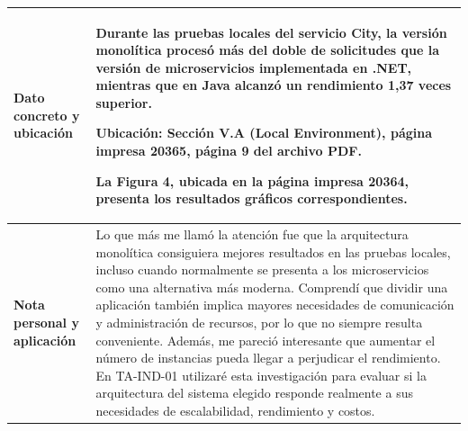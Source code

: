 \documentclass[11pt,a4paper]{article}
\begin{document}
\begin{longtable}{
|>{\raggedright\arraybackslash\bfseries}p{3.4cm}
|>{\raggedright\arraybackslash}p{11.6cm}|
}
Dato concreto y ubicación
&
Durante las pruebas locales del servicio City, la versión monolítica procesó más del doble de solicitudes que la versión de microservicios implementada en .NET, mientras que en Java alcanzó un rendimiento 1,37 veces superior.

\par\smallskip

\textbf{Ubicación:}
Sección V.A (Local Environment),
página impresa 20365,
página 9 del archivo PDF.

La Figura 4, ubicada en la página
impresa 20364, presenta los resultados
gráficos correspondientes.
\\
\hline


Nota personal y aplicación
&
Lo que más me llamó la atención fue que la arquitectura monolítica consiguiera mejores resultados en las pruebas locales, incluso cuando normalmente se presenta a los microservicios como una alternativa más moderna. Comprendí que dividir una aplicación también implica mayores necesidades de comunicación y administración de recursos, por lo que no siempre resulta conveniente. Además, me pareció interesante que aumentar el número de instancias pueda llegar a perjudicar el rendimiento. En TA-IND-01 utilizaré esta investigación para evaluar si la arquitectura del sistema elegido responde realmente a sus necesidades de escalabilidad, rendimiento y costos.
\\
\hline

\end{longtable}

\end{document}
